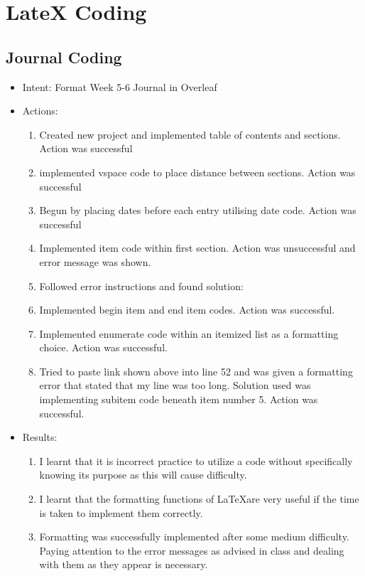 \documentclass{article}
\begin{document}
\vspace{5mm}

\section{LateX Coding}
\subsection{Journal Coding}
\date{27/8/2019 12:52}
\begin{itemize}
\item{Intent: Format Week 5-6 Journal in Overleaf}
\item{Actions:}
\begin{enumerate}
    \item{Created new project and implemented table of contents and sections. Action was successful}
    \item{implemented vspace code to place distance between sections. Action was successful}
    \item{Begun by placing dates before each entry utilising date code. Action was successful}
    \item{Implemented item code within first section. Action was unsuccessful and error message was shown.}
    \item{Followed error instructions and found solution:}
    \item{Implemented begin item and end item codes. Action was successful.}
    \item{Implemented enumerate code within an itemized list as a formatting choice. Action was successful.}
    \item{Tried to paste link shown above into line 52 and was given a formatting error that stated that my line was too long. Solution used was implementing subitem code beneath item number 5. Action was successful.}
    \end{enumerate}
\item{Results:}
\begin{enumerate}
    \item{I learnt that it is incorrect practice to utilize a code without specifically knowing its purpose as this will cause difficulty.}
    \item{I learnt that the formatting functions of \LaTeX are very useful if the time is taken to implement them correctly.}
    \item{Formatting was successfully implemented after some medium difficulty. Paying attention to the error messages as advised in class and dealing with them as they appear is necessary.}
\end{enumerate}
\end{itemize}
\end{document}
